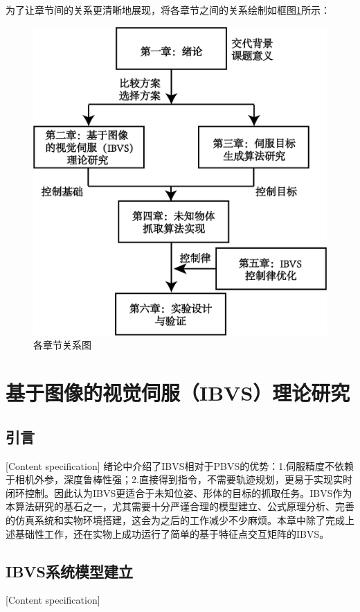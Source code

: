 \documentclass[fontset=fandol,type=bachelor,campus=harbin,bsmainpagenumberline=true]{hithesisbook}
\begin{document}
为了让章节间的关系更清晰地展现，将各章节之间的关系绘制如框图\ref{章节流程图}所示：
\begin{figure}[h]
\centering
\includegraphics[scale=1.0]{chapter1/章节流程图}
\caption{各章节关系图}
\label{章节流程图}
\end{figure}


\chapter[基于图像的视觉伺服（IBVS）理论研究]{基于图像的视觉伺服（IBVS）理论研究}
\section{引言}[Content specification]
绪论中介绍了IBVS相对于PBVS的优势：1.伺服精度不依赖于相机外参，深度鲁棒性强；2.直接得到指令，不需要轨迹规划，更易于实现实时闭环控制。因此认为IBVS更适合于未知位姿、形体的目标的抓取任务。IBVS作为本算法研究的基石之一，尤其需要十分严谨合理的模型建立、公式原理分析、完善的仿真系统和实物环境搭建，这会为之后的工作减少不少麻烦。本章中除了完成上述基础性工作，还在实物上成功运行了简单的基于特征点交互矩阵的IBVS。

\section{IBVS系统模型建立}[Content specification]
\end{document}
